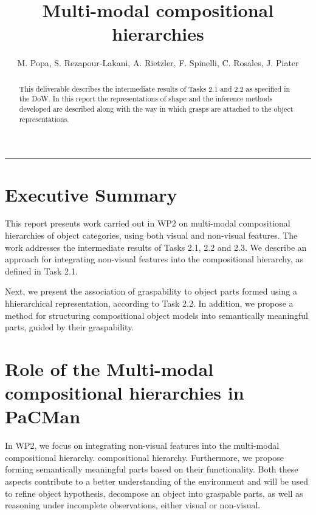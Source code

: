 \documentclass[a4paper,11pt,pdf]{pacmanreport}
\title{Multi-modal compositional hierarchies}
\author{M. Popa, S. Rezapour-Lakani, A. Rietzler, F. Spinelli, C. Rosales, J. Piater}
\begin{document}
\maketitle

\begin{abstract}
\noindent This deliverable describes the intermediate results of Tasks 2.1 and 2.2 as specified in the DoW. In this report the representations of shape and the inference methods developed are described along with the way in which grasps are attached to the object representations.
\end{abstract}

\vspace{.2em}
\hrule

\footnotesize

\tableofcontents

\normalsize

\newpage

\section*{Executive Summary}

This report presents work carried out in WP2 on multi-modal compositional hierarchies of object categories, using both visual and non-visual features. The 
work addresses the intermediate results of Tasks 2.1, 2.2 and 2.3. We describe 
an approach for integrating non-visual features into the compositional 
hierarchy, as defined in Task 2.1.

Next, we present the association of graspability to object parts formed using a hhierarchical representation, according to Task 2.2. In addition, we propose a 
method for structuring compositional object models into semantically meaningful 
parts, guided by their graspability.

\section*{Role of the Multi-modal compositional hierarchies in PaCMan}

In WP2, we focus on integrating non-visual features into the multi-modal compositional hierarchy. compositional hierarchy. Furthermore, we propose forming semantically meaningful parts based on their functionality. Both these aspects contribute to a better 
understanding of the environment and  will be used to refine object hypothesis, 
decompose an object into graspable parts, as well as reasoning under incomplete 
observations, either visual or non-visual.
\end{document}
